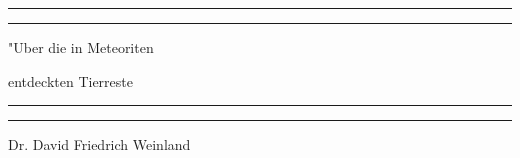 \documentclass[a4paper, 11pt, oneside]{article}
\begin{document}
\swabfamily
\renewcommand{\contentsname}{
\swabfamily{Inhaltsverzeichnis}
}
\let\origcftsecfont\cft
\let\origcftsecpagefont\cftsecpagefont
\let\origcftsecafterpnum\cftsecafterpnum
\renewcommand{\cftsecpagefont}{\swabfamily{\origcftsecpagefont}}
\renewcommand{\cftsecafterpnum}{\swabfamily{\origcftsecafterpnum}}
\let\origcftsubsecpagefont\cftsubsecpagefont
\let\origcftsubsecafterpnum\cftsubsecafterpnum
\renewcommand{\cftsubsecpagefont}{\swabfamily{\origcftsubsecpagefont}}
\renewcommand{\cftsubsecafterpnum}{\swabfamily{\origcftsubsecafterpnum}}
\let\origcftsubsubsecpagefont\cftsubsubsecpagefont
\let\origcftsubsubsecafterpnum\cftsubsubsecafterpnum
\renewcommand{\cftsubsubsecpagefont}{\swabfamily{\origcftsubsubsecpagefont}}
\renewcommand{\cftsubsubsecafterpnum}{\swabfamily{\origcftsubsubsecafterpnum}}
\begin{titlepage} %
	\centering %
	\scshape %

	
	\rule{\textwidth}{1.6pt}\vspace*{-\baselineskip}\vspace*{2pt} %
	\rule{\textwidth}{0.4pt} %
	
	\vspace{1.5\baselineskip} %
	
	{\Huge "Uber die in Meteoriten}
	
	\vspace{1.2\baselineskip}
	
	{\Huge entdeckten Tierreste}
	
	\vspace{1\baselineskip} %

	\rule{\textwidth}{0.4pt}\vspace*{-\baselineskip}\vspace{3.2pt} %
	\rule{\textwidth}{1.6pt} %
	
	\vspace{1\baselineskip} %
	
	
	{\Large Dr. David Friedrich Weinland} %
	

\end{titlepage}
\end{document}
